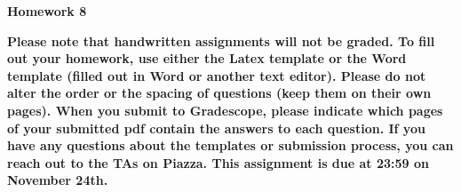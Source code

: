 \documentclass[12pt]{article}
\date{}
\begin{document}
	\begin{flushleft}
		\large \bf
		Homework 8 \\
	\end{flushleft}
{\bf
Please note that handwritten assignments will not be graded. To fill out your homework, use either the Latex template or the Word template (filled out in Word or another text editor). Please do not alter the order or the spacing of questions (keep them on their own pages). When you submit to Gradescope, please indicate which pages of your submitted pdf contain the answers to each question. If you have any questions about the templates or submission process, you can reach out to the TAs on Piazza. This assignment is due at 23:59 on November 24th.
}
\end{document}
